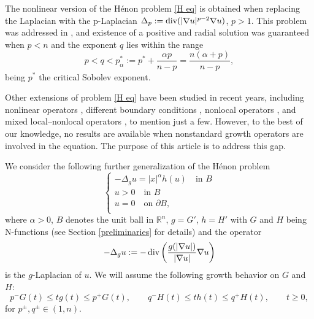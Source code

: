 \documentclass[leqno,twoside, 12pt]{amsart}
\theoremstyle{plain}
\numberwithin{equation}{section} \numberwithin{figure}{section}
\theoremstyle{definition}
\numberwithin{equation}{section}
\def\diver{\mathop{\text{\normalfont div}}}
\begin{document}
 
The nonlinear version of the H\'enon problem \eqref{H eq} is obtained when replacing the Laplacian with the p-Laplacian $\Delta_p:=\diver(|\nabla u|^{p-2}\nabla u)$, $p>1$. This problem was addressed in \cite{Nazarov}, and existence of a positive and radial solution was guaranteed when $p<n$ and the exponent $q$ lies within the range
\begin{equation} \label{cond p.lap}
p<q<p_\alpha^*:= p^* + \frac{\alpha p}{n-p} = \frac{n(\alpha + p)}{n-p},
\end{equation}
being $p^*$ the critical Sobolev exponent.
 
 
Other extensions of problem \eqref{H eq} have been studied in recent years, including nonlinear operators \cite{Nazarov, DP}, different boundary conditions \cite{GS,  H13,Sh}, nonlocal operators \cite{SW,L23}, and mixed local–nonlocal operators \cite{SV}, to mention just a few. However, to the best of our knowledge, no results are available when nonstandard growth operators are involved in the equation. The purpose of this article is to address this gap.
 
We consider the following further generalization of the H\'enon  problem
\begin{equation}\label{Henon eq}
\begin{cases}
-\Delta_g u= |x|^\alpha h( u) \quad \text{in }B\\
u>0 \quad \text{in }B\\
u= 0 \quad \text{on }\partial B,\\
\end{cases}
\end{equation}where $\alpha>0$, $B$ denotes the unit ball in $\mathbb{R}^n$,  $g=G'$, $h=H'$ with $G$ and $H$  being N-functions (see Section \ref{preliminaries} for details) and the operator
$$-\Delta_g u := -\diver\left(\dfrac{g(|\nabla u|)}{|\nabla u|}\nabla u \right)$$is the $g$-Laplacian of $u$. We will assume the following growth behavior on $G$ and $H$:
\begin{equation} \label{cond.intro}
p^- G(t) \leq tg(t) \leq p^+ G(t), \qquad 
q^- H(t) \leq th(t) \leq q^+ H(t), \qquad t\geq 0, 
\end{equation}
for    $p^\pm,q^\pm \in (1, n)$.  

\end{document}
